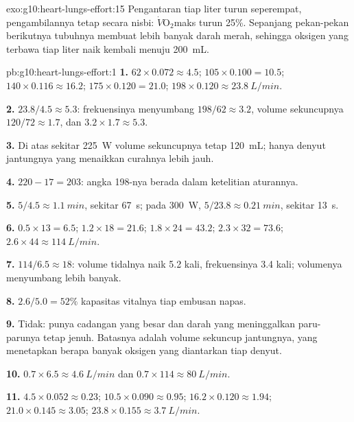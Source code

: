 \begin{solution}{exo:g10:heart-lungs-effort:15}
Pengantaran tiap liter turun seperempat, pengambilannya tetap secara
nisbi: $\dot V\!\mathrm{O_2}$maks turun 25\%. Sepanjang pekan-pekan
berikutnya tubuhnya membuat lebih banyak  darah merah, sehingga
oksigen yang terbawa tiap liter naik kembali menuju \qty{200}{mL}.
\end{solution}

\begin{solution}{pb:g10:heart-lungs-effort:1}
\textbf{1.} $62 \times 0.072 \approx 4.5$; $105 \times 0.100 = 10.5$;
$140 \times 0.116 \approx 16.2$; $175 \times 0.120 = 21.0$;
$198 \times 0.120 \approx \qty{23.8}{L/min}$.

\textbf{2.} $23.8/4.5 \approx 5.3$: frekuensinya menyumbang $198/62
\approx 3.2$, volume sekuncupnya $120/72 \approx 1.7$, dan $3.2 \times
1.7 \approx 5.3$.

\textbf{3.} Di atas sekitar \qty{225}{W} volume sekuncupnya tetap
\qty{120}{mL}; hanya denyut jantungnya yang menaikkan curahnya lebih jauh.

\textbf{4.} $220 - 17 = 203$: angka 198-nya berada dalam ketelitian aturannya.

\textbf{5.} $5/4.5 \approx \qty{1.1}{min}$, sekitar \qty{67}{s}; pada
\qty{300}{W}, $5/23.8 \approx \qty{0.21}{min}$, sekitar \qty{13}{s}.

\textbf{6.} $0.5 \times 13 = 6.5$; $1.2 \times 18 = 21.6$; $1.8 \times
24 = 43.2$; $2.3 \times 32 = 73.6$; $2.6 \times 44 \approx
\qty{114}{L/min}$.

\textbf{7.} $114/6.5 \approx 18$: volume tidalnya naik 5.2 kali,
frekuensinya 3.4 kali; volumenya menyumbang lebih banyak.

\textbf{8.} $2.6/5.0 = 52\%$ kapasitas vitalnya tiap embusan napas.

\textbf{9.} Tidak:  punya cadangan yang besar dan darah
yang meninggalkan paru-parunya tetap jenuh. Batasnya adalah volume
sekuncup jantungnya, yang menetapkan berapa banyak oksigen yang
diantarkan tiap denyut.

\textbf{10.} $0.7 \times 6.5 \approx \qty{4.6}{L/min}$ dan $0.7 \times
114 \approx \qty{80}{L/min}$.

\textbf{11.} $4.5 \times 0.052 \approx 0.23$; $10.5 \times 0.090
\approx 0.95$; $16.2 \times 0.120 \approx 1.94$; $21.0 \times 0.145
\approx 3.05$; $23.8 \times 0.155 \approx \qty{3.7}{L/min}$.


\end{solution}
